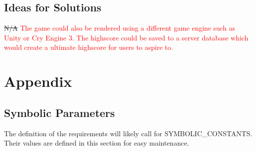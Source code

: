 \documentclass[12pt, titlepage]{article}
\begin{document}
\subsection{Ideas for Solutions}
\sout{N/A} \textcolor{red}{The game could also be rendered using a different game engine such as Unity or Cry Engine 3. The highscore could be saved to a server database which would create a ultimate highscore for users to aspire to.}





\newpage

\section{Appendix}

\subsection{Symbolic Parameters}

The definition of the requirements will likely call for SYMBOLIC\_CONSTANTS.
Their values are defined in this section for easy maintenance.
\end{document}
